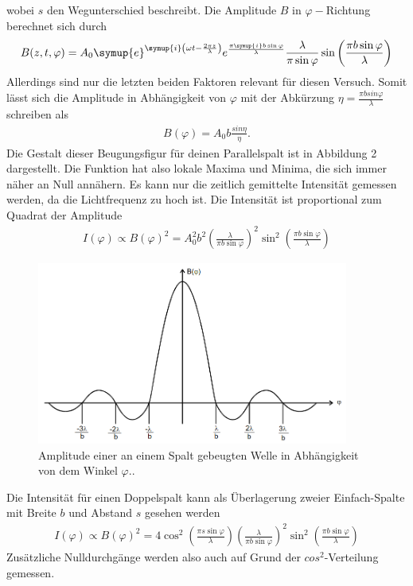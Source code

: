 wobei $s$ den Wegunterschied beschreibt.
Die Amplitude $B$ in $\varphi-$Richtung berechnet sich durch
\begin{align}
  B(z,t, \varphi) = A_0 \symup{e}^{\symup{i} \left(\omega t - \frac{2\pi z}{\lambda} \right)} e^{\frac{\pi \symup{i} b \sin{\varphi}}{\lambda}} \frac{\lambda}{\pi \sin{\varphi}}
  \sin{\left(\frac{\pi b \sin{\varphi}}{\lambda}\right)}
\end{align}
Allerdings sind nur die letzten beiden Faktoren relevant für diesen Versuch. Somit lässt sich die Amplitude in Abhängigkeit von $\varphi$ mit der Abkürzung $\eta = \frac{\pi b sin \varphi}{\lambda}$ schreiben als
\begin{align}
   B(\varphi) = A_0 b \frac{sin \eta}{\eta}.
\end{align}
Die Gestalt dieser Beugungsfigur für deinen Parallelspalt ist in Abbildung 2 dargestellt.
Die Funktion hat also lokale Maxima und Minima, die sich immer näher an Null annähern.
Es kann nur die zeitlich gemittelte Intensität gemessen werden, da die Lichtfrequenz zu hoch ist. Die Intensität ist proportional zum Quadrat der Amplitude
\begin{align}
  I(\varphi) \propto B(\varphi)^2 = A_0^2 b^2 \left(\frac{\lambda}{\pi b \sin{\varphi}} \right)^2  \sin^2{\left(\frac{\pi b \sin{\varphi}}{\lambda}\right)}
\end{align}
\begin{figure}[H]
  \centering
  \includegraphics[height=6cm]{beugung.PNG}
  \caption{Amplitude einer an einem Spalt gebeugten Welle in Abhängigkeit von dem Winkel $\varphi$.\cite{kent}.}
\end{figure}

\noindent Die Intensität für einen Doppelspalt kann als Überlagerung zweier Einfach-Spalte mit Breite $b$ und Abstand $s$ gesehen werden
\begin{align}
   I(\varphi) \propto B(\varphi)^2 = 4 \cos^2{\left(\frac{\pi s \sin{\varphi}}{\lambda}\right)} \left(\frac{\lambda}{\pi b \sin{\varphi}}\right)^2
   \sin^2{\left(\frac{\pi b \sin{\varphi}}{\lambda}\right)}
\end{align}
Zusätzliche Nulldurchgänge werden also auch auf Grund der $cos^2$-Verteilung gemessen.
